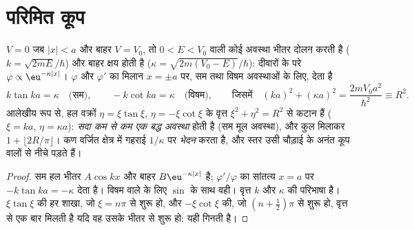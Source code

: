 \section{परिमित कूप}

\begin{proposition}[परिमित वर्गाकार कूप]\label{prop:b2:potential-wells-tunneling:finite}
$V = 0$ जब $|x| < a$ और बाहर $V = V_0$, तो $0 < E < V_0$ वाली कोई अवस्था
भीतर दोलन करती है ($k = \sqrt{2mE}/\hbar$) और बाहर क्षय होती है ($\kappa =
\sqrt{2m(V_0 - E)}/\hbar$): दीवारों के परे $\varphi \propto \eu^{-\kappa|x|}$।
$\varphi$ और $\varphi'$ का मिलान $x = \pm a$ पर, सम तथा विषम
अवस्थाओं के लिए, देता है
\[
k\tan ka = \kappa \quad\text{(सम)}, \qquad
-k\cot ka = \kappa \quad\text{(विषम)}, \qquad\text{जिसमें}\quad
(ka)^2 + (\kappa a)^2 = \frac{2mV_0a^2}{\hbar^2} \equiv R^2 .
\]
आलेखीय रूप से, हल वक्रों $\eta =
\xi\tan\xi$, $\eta = -\xi\cot\xi$ के वृत्त $\xi^2 + \eta^2 = R^2$ से कटान हैं
($\xi = ka$, $\eta = \kappa a$): \emph{सदा कम से कम एक बद्ध
अवस्था} होती है (सम मूल अवस्था), और कुल मिलाकर $1 + \lfloor 2R/\pi\rfloor$।
कण वर्जित क्षेत्र में गहराई $1/\kappa$ पर \emph{भेदन} करता है,
और स्तर उसी चौड़ाई के अनंत कूप वालों से
नीचे पड़ते हैं।
\end{proposition}

\begin{proof}
सम हल भीतर $A\cos kx$ और बाहर $B\eu^{-\kappa|x|}$ है;
$\varphi'/\varphi$ का सांतत्य $x = a$ पर $-k\tan ka = -\kappa$ देता है। विषम वाले के लिए
$\sin$ के साथ वही। वृत्त $k$ और
$\kappa$ की परिभाषा है। $\xi\tan\xi$ की हर शाखा, जो $\xi = n\pi$ से शुरू हो, और
$-\xi\cot\xi$ की, जो $(n + \tfrac12)\pi$ से शुरू हो, वृत्त से एक बार मिलती है यदि वह
उसके भीतर से शुरू हो: यही गिनती है।
\end{proof}

